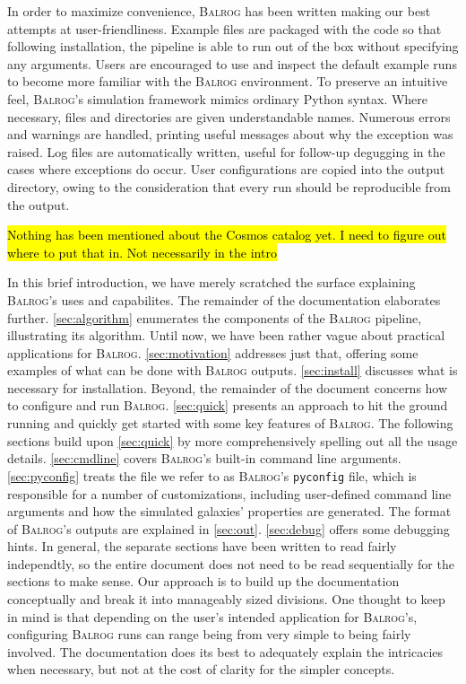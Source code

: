 \documentclass[12pt]{book}
\newcommand{\codett}[1]{\lstinline{#1}}
\newcommand{\py}{Python}
\newcommand{\pyconfig}{\codett{pyconfig}}
\newcommand{\balrog}{\textsc{Balrog}}
\begin{document}
In order to maximize convenience,
\balrog{} has been written making our best attempts at user-friendliness.
Example files are packaged with the code so that following installation,
the pipeline is able to run out of the box without specifying any arguments.
Users are encouraged to use and inspect the default example runs 
to become more familiar with the \balrog{} environment.
To preserve an intuitive feel, \balrog{}'s simulation framework mimics ordinary \py{} syntax. 
Where necessary, files and directories are given understandable names.
Numerous errors and warnings are handled, printing useful messages
about why the exception was raised.
Log files are automatically written, useful for follow-up degugging
in the cases where exceptions do occur. User configurations are copied into
the output directory, owing to the consideration that every run should be
reproducible from the output.

\hl{Nothing has been mentioned about the Cosmos catalog yet. I need to figure out where to put that in. Not necessarily in the intro}

In this brief introduction, we have merely scratched the surface explaining \balrog{}'s
uses and capabilites. The remainder of the documentation elaborates further.
\autoref{sec:algorithm} enumerates the components of the \balrog{} pipeline, illustrating its algorithm.
Until now, we have been rather vague about practical applications for \balrog{}.
\autoref{sec:motivation} addresses just that, offering some examples of what can be done with \balrog{} outputs.
\autoref{sec:install} discusses what is necessary for installation.
Beyond, the remainder of the document concerns how to configure and run \balrog{}.
\autoref{sec:quick} presents an approach to hit the ground running and quickly get
started with some key features of \balrog{}.
The following sections build upon \autoref{sec:quick} by more comprehensively spelling out all the usage details.
\autoref{sec:cmdline} covers \balrog{}'s built-in command line arguments.
\autoref{sec:pyconfig} treats the file we refer to as \balrog{}'s \pyconfig{} file, which is responsible for a number of customizations,
including user-defined command line arguments and how the simulated galaxies' properties are generated.
The format of \balrog{}'s outputs are explained in \autoref{sec:out}.
\autoref{sec:debug} offers some debugging hints.
In general, the separate sections have been written to read fairly independtly,
so the entire document does not need to be read sequentially for the sections to make sense.
Our approach is to build up the documentation conceptually and break it into manageably sized divisions.
One thought to keep in mind is that depending on the user's intended application for \balrog{}'s,
configuring \balrog{} runs can range being from very simple to being fairly involved.
The documentation does its best to adequately explain the intricacies when necessary,
but not at the cost of clarity for the simpler concepts.
\end{document}
